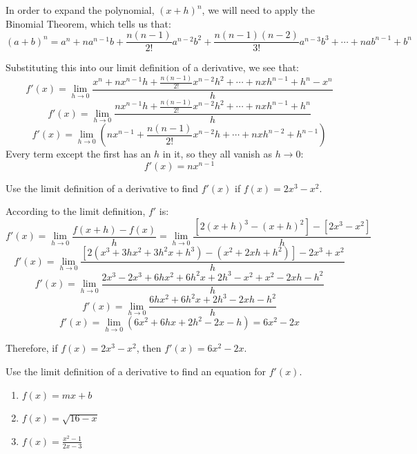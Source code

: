 In order to expand the polynomial, $(x + h)^n$, we will need to apply the 
Binomial Theorem, which tells us that:
$$(a + b)^n = a^n + na^{n - 1}b + \frac{n(n - 1)}{2!}a^{n - 2}b^2 + \frac{n(n 
- 1)(n - 2)}{3!}a^{n - 3}b^3 + \cdots + nab^{n - 1} + b^n$$

Substituting this into our limit definition of a derivative, we see that:
$$f'(x) = \lim_{h \to 0} \frac{x^n + nx^{n-1}h + \frac{n(n-1)}{2!}x^{n-2}h^2 
+ \cdots + nxh^{n-1} + h^n - x^n}{h}$$
$$f'(x) = \lim_{h \to 0} \frac{nx^{n-1}h + \frac{n(n-1)}{2!}x^{n-2}h^2 + 
\cdots + nxh^{n-1} + h^n}{h}$$
$$f'(x) = \lim_{h \to 0} \left( nx^{n-1} + \frac{n(n-1)}{2!}x^{n-2}h + \cdots + nxh^{
n-2} + h^{n-1} \right)$$
Every term except the first has an $h$ in it, so they all vanish as $h \to 0$:
$$f'(x) = nx^{n-1}$$

\begin{Worked}
\begin{Problem}
Use the limit definition of a derivative to find $f'(x)$ if
$f(x) = 2x^3 - x^2$. 
\end{Problem}
\begin{Solution}
According to the limit definition, $f'$ is:
$$f'(x) = \lim_{h \to 0} \frac{f(x + h) - f(x)}{h} = \lim_{h \to 0} \frac{\left[ 2\left( x + 
h \right)^3 - \left( x + h \right)^2 \right] - \left[ 2x^3 - x^2 \right]}{h}$$
$$f'(x) = \lim_{h \to 0} \frac{\left[ 2 \left( x^3 + 3 h x^2 + 3 h^2 x + h^3 
\right) - \left( x^2 + 2xh + h^2 \right) \right] - 2 x^3 + x^2}{h}$$
$$f'(x) = \lim_{h \to 0} \frac{2x^3 - 2x^3 + 6 h x^2 + 6 h^2 x + 2 h^3 - x^2 + 
x^2 -2 x h - h^2}{h}$$
$$f'(x) = \lim_{h \to 0} \frac{6 h x^2 + 6 h^2 x + 2 h^3 - 2 x h - h^2}{h}$$
$$f'(x) = \lim_{h \to 0} \left( 6 x^2 + 6 h x + 2 h^2 - 2x - h \right) = 6 x^2 - 2 x$$

Therefore, if $f(x) = 2x^3 - x^2$, then $f'(x) = 6x^2 - 2x$. 
\end{Solution}
\end{Worked}

\begin{Exercise}[title = {Finding Functions for Derivatives}, label = deriv1]
Use the limit definition of a derivative to find an equation for $f'(x)$.
\begin{enumerate}
\item $f(x) = mx + b$
\item $f(x) = \sqrt{16 - x}$
\item $f(x) = \frac{x^2 - 1}{2x - 3}$
\end{enumerate}
\end{Exercise}

